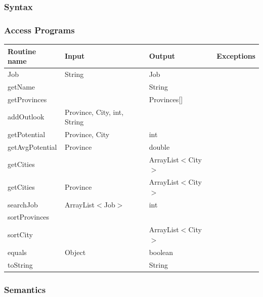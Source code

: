 \documentclass[12pt,fleqn]{article}
\begin{document}
\subsubsection* {Syntax}

\subsubsection* {Access Programs}
\begin{tabular}{| l | l | l | l |}
\hline
\textbf{Routine name} & \textbf{Input} & \textbf{Output} & \textbf{Exceptions}\\
\hline
Job & String & Job & ~\\
\hline
getName & ~ & String & ~\\
\hline
getProvinces & ~ & Provinces[] & ~\\
\hline
addOutlook & Province, City, int, String & ~  & ~\\
\hline
getPotential & Province, City & int & ~\\
\hline
getAvgPotential & Province & double & ~\\
\hline
getCities & ~ & ArrayList$<$City$>$ & ~\\
\hline
getCities & Province &  ArrayList$<$City$>$ & ~\\
\hline
searchJob &ArrayList$<$Job$>$  & int & ~\\
\hline
sortProvinces & ~ & ~ & ~\\
\hline
sortCity & ~ & ArrayList$<$City$>$ & ~\\
\hline
equals & Object & boolean & ~\\
\hline
toString & ~ & String & ~\\
\hline
\end{tabular}

\subsubsection*{Semantics}
\end{document}
